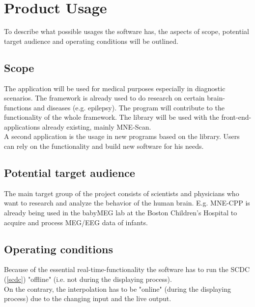 \section{Product Usage}
To describe what possible usages the software has, the aspects of scope, potential target audience and operating conditions will be outlined. 
\subsection{Scope}\label{3_1_scope}
The application will be used for medical purposes especially in diagnostic scenarios. The framework is already used to do research on certain brain-functions and diseases (e.g. epilepsy). The program  will contribute to the functionality of the whole framework. The library will be used with the front-end-applications already existing, mainly MNE-Scan.\\
A second application is the usage in new programs based on the library. Users can rely on the functionality and build new software for his needs.


\subsection{Potential target audience}
The main target group of the project consists of scientists and physicians who want to research and analyze the behavior of the human brain. E.g. MNE-CPP is already being used in the babyMEG lab at the Boston Children's Hospital to acquire and process MEG/EEG data of infants.

\subsection{Operating conditions}
Because of the essential real-time-functionality the software has to run the SCDC (\ref{scdc}) "offline" (i.e. not during the displaying process). \\
On the contrary, the interpolation has to be "online" (during the displaying process) due to the changing input and the live output.
